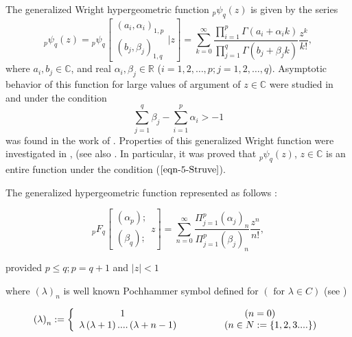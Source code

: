 \documentclass{amsart}
\theoremstyle{plain}
\numberwithin{equation}{section}
\begin{document}
The generalized Wright hypergeometric function ${}_{p}\psi _{q}(z)$ is given
by the series 
\begin{equation}
{}_{p}\psi _{q}(z)={}_{p}\psi _{q}\left[ 
\begin{array}{c}
(a_{i},\alpha _{i})_{1,p} \\ 
(b_{j},\beta _{j})_{1,q}\end{array}\bigg|z\right] =\displaystyle\sum_{k=0}^{\infty }\dfrac{\prod_{i=1}^{p}\Gamma (a_{i}+\alpha _{i}k)}{\prod_{j=1}^{q}\Gamma (b_{j}+\beta _{j}k)}\dfrac{z^{k}}{k!},  \label{eqn-4-Struve}
\end{equation}where $a_{i},b_{j}\in \mathbb{C}$, and real $\alpha _{i},\beta _{j}\in 
\mathbb{R}$ ($i=1,2,\ldots ,p;j=1,2,\ldots ,q$). Asymptotic behavior of this
function for large values of argument of $z\in {\mathbb{C}}$ were studied in 
\cite{Foxc} and under the condition 
\begin{equation}
\displaystyle\sum_{j=1}^{q}\beta _{j}-\displaystyle\sum_{i=1}^{p}\alpha
_{i}>-1  \label{eqn-5-Struve}
\end{equation}was found in the work of \cite{Wright-2,Wright-3}. Properties of this
generalized Wright function were investigated in \cite{Kilbas}, (see also 
\cite{Kilbas-itsf, Kilbas-frac}. In particular, it was proved \cite{Kilbas}
that ${}_{p}\psi _{q}(z)$, $z\in {\mathbb{C}}$ is an entire function under
the condition ($\ref{eqn-5-Struve}$).

The generalized hypergeometric function represented as follows \cite{Rainville}:

\begin{equation}
_{p}F_{q}\left[ 
\begin{array}{c}
\left( \alpha _{p}\right) ; \\ 
\left( \beta _{q}\right) ;\end{array}z\right] =\sum\limits_{n=0}^{\infty }\frac{\Pi _{j=1}^{p}\left( \alpha
_{j}\right) _{n}}{\Pi _{j=1}^{p}\left( \beta _{j}\right) _{n}}\frac{z^{n}}{n!},  \label{eqn-1-hyper}
\end{equation}

provided $p\leq q; p=q+1$ and $\left\vert z\right\vert <1$

where $\left( \lambda \right) _{n}$ is well known Pochhammer symbol defined
for $\left( \text{ for }\lambda \in C\right) $ (see \cite{Rainville})

\begin{equation}
\left( \lambda \right) _{n}:=\left\{ 
\begin{array}{c}
1\text{ \ \ \ \ \ \ \ \ \ \ \ \ \ \ \ \ \ \ \ \ \ \ \ \ \ \ \ \ \ \ \ \ \ \
\ \ }\left( n=0\right) \\ 
\lambda \left( \lambda +1\right) ....\left( \lambda +n-1\right) \text{ \ \ \
\ \ \ \ \ \ \ \ \ \ }\left( n\in N:=\{1,2,3....\}\right)\end{array}\right.  \label{eqn-2-hyper}
\end{equation}
\end{document}
